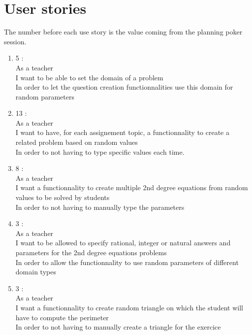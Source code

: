 \documentclass{article}
\begin{document}
\section{User stories}

The number before each use story is the value coming from the planning poker session.\\

\begin{enumerate}



    \item 5 :\\ %
    As a teacher\\
    I want to be able to set the domain of a problem\\
    In order to let the question creation functionnalities use this domain for random parameters\\

    \item 13 :\\ %
    As a teacher\\
    I want to have, for each assignement topic, a functionnality to create a related problem based on random values\\
    In order to not having to type specific values each time.\\

    \item 8 :\\ %
    As a teacher\\
    I want a functionnality to create multiple 2nd degree equations from random values to be solved by students\\
    In order to not having to manually type the parameters\\

    \item 3 :\\ %
    As a teacher\\
    I want to be allowed to specify rational, integer or natural answers and parameters for the 2nd degree equations problems\\
    In order to allow the functionnality to use random parameters of different domain types\\

    \item 3 :\\
    As a teacher\\ %
    I want a functionnality to create random triangle on which the student will have to compute the perimeter\\
    In order to not having to manually create a triangle for the exercice\\


\end{enumerate}
\end{document}
